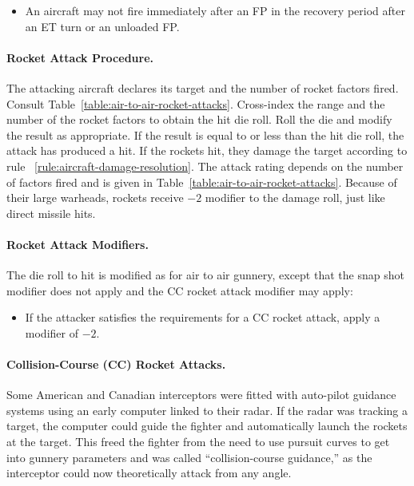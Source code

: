 \begin{advancedrules}
{\begin{itemize}
    \item An aircraft may not fire immediately after an FP in the recovery period after an ET turn or an unloaded FP.

\end{itemize}

\paragraph{Rocket Attack Procedure.} The attacking aircraft declares its target and the number of rocket factors fired. Consult Table~\ref{table:air-to-air-rocket-attacks}. Cross-index the range and the number of the rocket factors to obtain the hit die roll. Roll the die and modify the result as appropriate. If the result is equal to or less than the hit die roll, the attack has produced a hit. If the rockets hit, they damage the target according to rule ~\ref{rule:aircraft-damage-resolution}. The attack rating depends on the number of factors fired and is given in Table~\ref{table:air-to-air-rocket-attacks}. Because of their large warheads, rockets receive $-2$ modifier to the damage roll, just like direct missile hits.

\paragraph{Rocket Attack Modifiers.} 
The die roll to hit is modified as for air to air gunnery, except that the snap shot modifier does not apply and the CC rocket attack modifier may apply:

\begin{itemize}
    \item {} If the attacker satisfies the requirements for a CC rocket attack, apply a modifier of $-2$.
\end{itemize}

\paragraph{Collision-Course (CC) Rocket Attacks.} Some American and Canadian interceptors were fitted with auto-pilot guidance systems using an early computer linked to their radar. If the radar was tracking a target, the computer could guide the fighter and automatically launch the rockets at the target. This freed the fighter from the need to use pursuit curves to get into gunnery parameters and was called “collision-course guidance,” as the interceptor could now theoretically attack from any angle.

}
\end{advancedrules}

